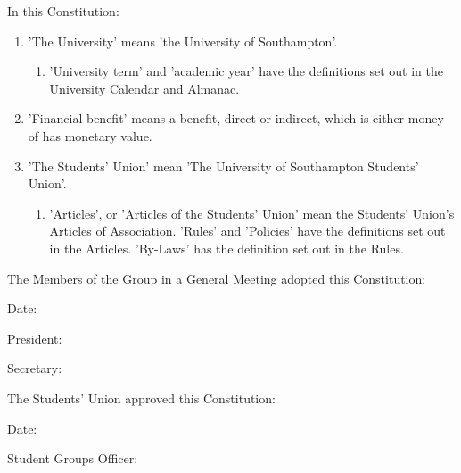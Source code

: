 \documentclass[12pt]{constitution}
\begin{document}
In this Constitution:
\begin{enumerate}
    \item 'The University' means 'the University of Southampton'.
    \begin{enumerate}
        \item 'University term' and 'academic year' have the definitions set out in the University Calendar and Almanac.
    \end{enumerate}

    \item 'Financial benefit' means a benefit, direct or indirect, which is either money of has monetary value.
    \item 'The Students' Union' mean 'The University of Southampton Students' Union'.
    \begin{enumerate}
        \item 'Articles', or 'Articles of the Students' Union' mean the Students' Union's Articles of Association. 'Rules' and 'Policies' have the definitions set out in the Articles. 'By-Laws' has the definition set out in the Rules.
    \end{enumerate}
\end{enumerate}



The Members of the Group in a General Meeting adopted this Constitution:

Date: 

President: 

Secretary:

The Students' Union approved this Constitution:

Date:

Student Groups Officer:
\end{document}
